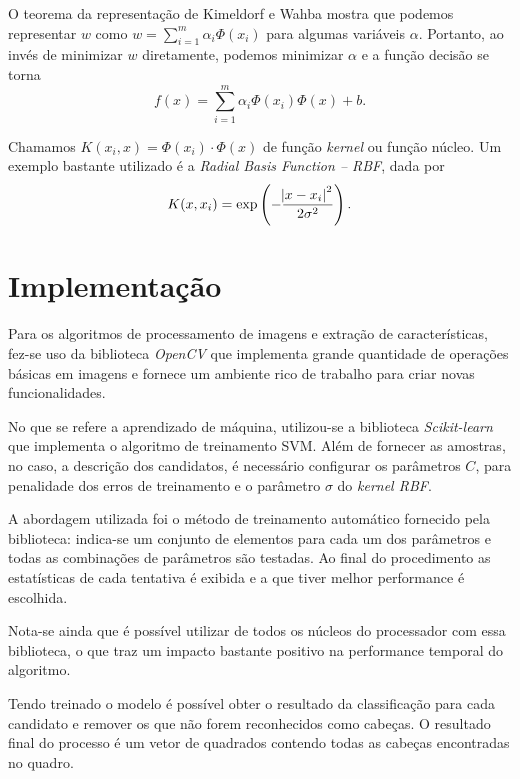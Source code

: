 O teorema da representação de Kimeldorf e Wahba mostra que podemos representar $w$ como $w=\sum_{i=1}^m \alpha_i \Phi(x_i)$ para algumas variáveis $\alpha$. Portanto, ao invés de minimizar $w$ diretamente, podemos minimizar $\alpha$ e a função decisão se torna
\begin{equation}
	\label{eq:svm-decision-func}
	f(x)=\sum_{i=1}^m \alpha_i \Phi(x_i) \Phi(x) +b.
\end{equation}

Chamamos $K(x_i, x) = \Phi(x_i) \cdot \Phi(x)$ de função \textit{kernel} ou função núcleo. Um exemplo bastante utilizado é a \textit{Radial Basis Function -- RBF}, dada por
\begin{equation}
	\label{eq:svm-kernel-func}
	K(x,x_i) = \exp\left(-\frac{\abs{x-x_i}^2}{2\sigma^2}\right).
\end{equation}

\section{Implementação}
Para os algoritmos de processamento de imagens e extração de características, fez-se uso da biblioteca \textit{OpenCV} que implementa grande quantidade de operações básicas em imagens e fornece um ambiente rico de trabalho para criar novas funcionalidades.

No que se refere a aprendizado de máquina, utilizou-se a biblioteca \textit{Scikit-learn} que implementa o algoritmo de treinamento SVM. Além de fornecer as amostras, no caso, a descrição dos candidatos, é necessário configurar os parâmetros $C$, para penalidade dos erros de treinamento e o parâmetro $\sigma$ do \textit{kernel RBF}. 

A abordagem utilizada foi o método de treinamento automático fornecido pela biblioteca: indica-se um conjunto de elementos para cada um dos parâmetros e todas as combinações de parâmetros são testadas. Ao final do procedimento as estatísticas de cada tentativa é exibida e a que tiver melhor performance é escolhida.

Nota-se ainda que é possível utilizar de todos os núcleos do processador com essa biblioteca, o que traz um impacto bastante positivo na performance temporal do algoritmo.

Tendo treinado o modelo é possível obter o resultado da classificação para cada candidato e remover os que não forem reconhecidos como cabeças. O resultado final do processo é um vetor de quadrados contendo todas as cabeças encontradas no quadro.

